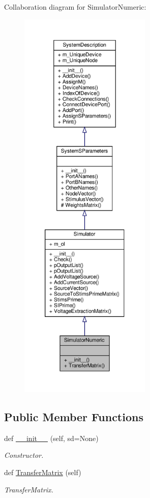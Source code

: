 Collaboration diagram for Simulator\+Numeric\+:
\nopagebreak
\begin{figure}[H]
\begin{center}
\leavevmode
\includegraphics[height=550pt]{classSignalIntegrity_1_1SystemDescriptions_1_1SimulatorNumeric_1_1SimulatorNumeric__coll__graph}
\end{center}
\end{figure}
\subsection*{Public Member Functions}
\begin{DoxyCompactItemize}
\item 
def \hyperlink{classSignalIntegrity_1_1SystemDescriptions_1_1SimulatorNumeric_1_1SimulatorNumeric_a2fa2ae61a4511a760e2d2047ec07eb05}{\+\_\+\+\_\+init\+\_\+\+\_\+} (self, sd=None)
\begin{DoxyCompactList}\small\item\em Constructor. \end{DoxyCompactList}\item 
def \hyperlink{classSignalIntegrity_1_1SystemDescriptions_1_1SimulatorNumeric_1_1SimulatorNumeric_aecf838369a0d4e9037ba351539bd8eb1}{Transfer\+Matrix} (self)
\begin{DoxyCompactList}\small\item\em Transfer\+Matrix. \end{DoxyCompactList}\end{DoxyCompactItemize}

